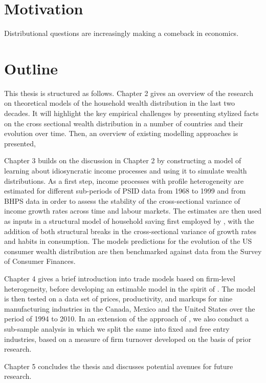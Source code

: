 \section{Motivation}
Distributional questions are increasingly making a comeback in economics. 


\section{Outline}
This thesis is structured as follows. Chapter 2 gives an overview of the research on theoretical models of the household wealth distribution in the last two decades. It will highlight the key empirical challenges by presenting stylized facts on the cross sectional wealth distribution in a number of countries and their evolution over time. Then, an overview of existing modelling approaches is presented,  

Chapter 3 builds on the discussion in Chapter 2 by constructing a model of learning about idiosyncratic income processes and using it to simulate wealth distributions. As a first step, income processes with profile heterogeneity are estimated for different sub-periods of PSID data from 1968 to 1999 and from BHPS data in order to assess the stability of the cross-sectional variance of income growth rates across time and labour markets. The estimates are then used as inputs in a structural model of household saving first employed by \citet{Guvenen2007}, with the addition of both structural breaks in the cross-sectional variance of growth rates and habits in consumption. The models predictions for the evolution of the US consumer wealth distribution are then benchmarked against data from the Survey of Consumer Finances. 

Chapter 4 gives a brief introduction into trade models based on firm-level heterogeneity, before developing an estimable model in the spirit of \citet{Chen2009}. The model is then tested on a data set of prices, productivity, and markups for nine manufacturing industries in the Canada, Mexico and the United States over the period of 1994 to 2010. In an extension of the approach of \citet{Chen2009}, we also conduct a sub-sample analysis in which we split the same into fixed and free entry industries, based on a measure of firm turnover developed on the basis of prior research. 

Chapter 5 concludes the thesis and discusses potential avenues for future research.